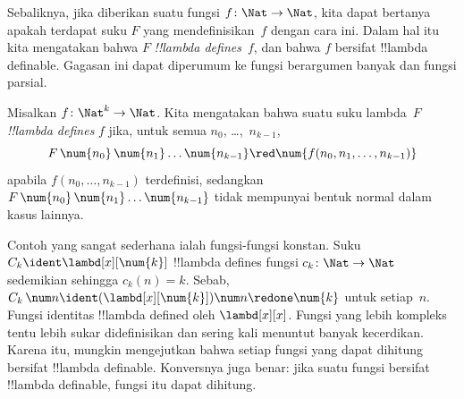 \documentclass[../../../include/open-logic-section]{subfiles}
\begin{document}
Sebaliknya, jika diberikan suatu fungsi $f\colon \Nat \to \Nat$, kita dapat
bertanya apakah terdapat suku $F$ yang mendefinisikan~$f$ dengan cara ini.
Dalam hal itu kita mengatakan bahwa $F$ \emph{!!{lambda define}s}~$f$, dan
bahwa $f$ bersifat !!{lambda definable}. Gagasan ini dapat diperumum ke fungsi
berargumen banyak dan fungsi parsial.

\begin{defn}
Misalkan $f\colon \Nat^k \to \Nat$. Kita mengatakan bahwa suatu suku
lambda~$F$ \emph{!!{lambda define}s} $f$ jika, untuk semua
$n_0$, \dots,~$n_{k-1}$,
\[
F \, \num{n_0} \, \num{n_1} \dots \num{n_{k-1}} \red \num{f(n_0, n_1, \dots,
  n_{k-1})}
\]
apabila $f(n_0, \dots, n_{k-1})$ terdefinisi, sedangkan
$F \, \num{n_0} \, \num{n_1} \dots \num{n_{k-1}}$ tidak mempunyai bentuk
normal dalam kasus lainnya.
\end{defn}

Contoh yang sangat sederhana ialah fungsi-fungsi konstan. Suku $C_k \ident
\lambd[x][\num{k}]$ !!{lambda define}s fungsi $c_k\colon \Nat \to
\Nat$ sedemikian sehingga $c_k(n) = k$. Sebab,
$C_k \, \num n \ident (\lambd[x][\num{k}])\num n \redone \num{k}$ untuk
setiap~$n$.
Fungsi identitas !!{lambda defined} oleh $\lambd[x][x]$. Fungsi yang lebih
kompleks tentu lebih sukar didefinisikan dan sering kali menuntut banyak
kecerdikan. Karena itu, mungkin mengejutkan bahwa setiap fungsi yang dapat
dihitung bersifat !!{lambda definable}. Konversnya juga benar: jika suatu
fungsi bersifat !!{lambda definable}, fungsi itu dapat dihitung.
\end{document}
